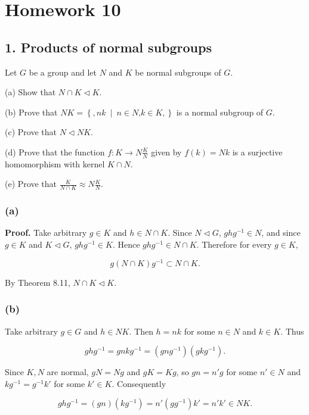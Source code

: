 \chapter{Homework 10}

\section{1. Products of normal subgroups}

Let \(G\) be a group and let \(N\) and \(K\) be normal subgroups of \(G\).

(a) Show that \(N \cap K \lhd K\).

(b) Prove that \(NK = \left\{ ,nk\  \middle| \ n \in N\text{,}k \in K, \right\}\) is a normal subgroup of \(G\).

(c) Prove that \(N \lhd NK\).

(d) Prove that the function \(f:K\rightarrow N\frac{K}{N}\) given by \(f(k) = Nk\) is a surjective homomorphism with kernel \(K \cap N\).

(e) Prove that \(\frac{K}{N \cap K} \approx N\frac{K}{N}\).

\subsection{(a)}

\textbf{Proof.} Take arbitrary \(g \in K\) and \(h \in N \cap K\). Since \(N \lhd G\), \(ghg^{- 1} \in N\), and since \(g \in K\) and \(K \lhd G\), \(ghg^{- 1} \in K\). Hence \(ghg^{- 1} \in N \cap K\). Therefore for every \(g \in K\),

\[g\left( {N \cap K} \right)g^{- 1} \subset N \cap K.\]

By Theorem 8.11, \(N \cap K \lhd K\).

\subsection{(b)}

Take arbitrary \(g \in G\) and \(h \in NK\). Then \(h = nk\) for some \(n \in N\) and \(k \in K\). Thus

\[ghg^{- 1} = gnkg^{- 1} = \left( {gng^{- 1}} \right)\left( {gkg^{- 1}} \right).\]

Since \(K,N\) are normal, \(gN = Ng\) and \(gK = Kg\), so \(gn = n'g\) for some \(n' \in N\) and \(kg^{- 1} = g^{- 1}k'\) for some \(k' \in K\). Consequently

\[ghg^{- 1} = \left( {gn} \right)\left( {kg^{- 1}} \right) = n'\left( {gg^{- 1}} \right)k' = n'k' \in NK.\]

